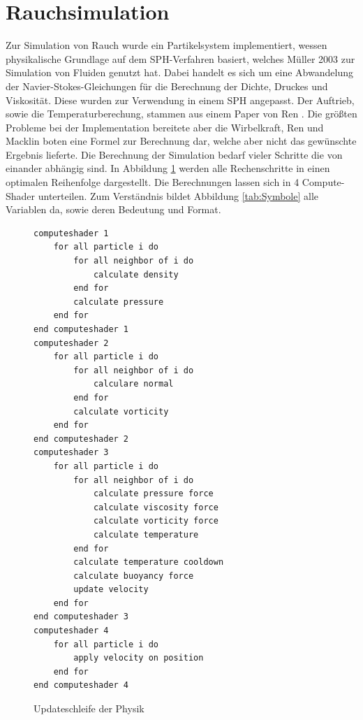 \documentclass[intern,palatino]{cgBA}
\begin{document}

\section{Rauchsimulation}\label{rauch}

Zur Simulation von Rauch wurde ein Partikelsystem implementiert, wessen physikalische Grundlage auf dem SPH-Verfahren basiert, welches Müller \cite{muller2003particle} 2003 zur Simulation von Fluiden genutzt hat. Dabei handelt es sich um eine Abwandelung der Navier-Stokes-Gleichungen für die Berechnung der Dichte, Druckes und Viskosität. Diese wurden zur Verwendung in einem SPH angepasst. Der Auftrieb, sowie die Temperaturberechung, stammen aus einem Paper von Ren \cite{ren2016fast}. Die größten Probleme bei der Implementation bereitete aber die Wirbelkraft, Ren und Macklin \cite{macklin2014unified} boten eine Formel zur Berechnung dar, welche aber nicht das gewünschte Ergebnis lieferte.
\newline
Die Berechnung der Simulation bedarf vieler Schritte die von einander abhängig sind. In Abbildung  \ref{code:sim} werden alle Rechenschritte in einen optimalen Reihenfolge dargestellt. Die Berechnungen lassen sich in 4 Compute-Shader unterteilen.
\newline
Zum Verständnis bildet Abbildung \ref{tab:Symbole} alle Variablen da, sowie deren Bedeutung und Format.

\begin{figure}
	\centering
	\begin{lstlisting}
computeshader 1	
	for all particle i do
		for all neighbor of i do
			calculate density
		end for
		calculate pressure
	end for
end computeshader 1
computeshader 2
	for all particle i do
		for all neighbor of i do
			calculare normal
		end for
		calculate vorticity
	end for
end computeshader 2
computeshader 3
	for all particle i do
		for all neighbor of i do
			calculate pressure force
			calculate viscosity force
			calculate vorticity force
			calculate temperature
		end for
		calculate temperature cooldown
		calculate buoyancy force
		update velocity
	end for
end computeshader 3
computeshader 4
	for all particle i do
		apply velocity on position
	end for
end computeshader 4
	\end{lstlisting}
	\caption{Updateschleife der Physik}
	\label{code:sim}
\end{figure}
\end{document}
